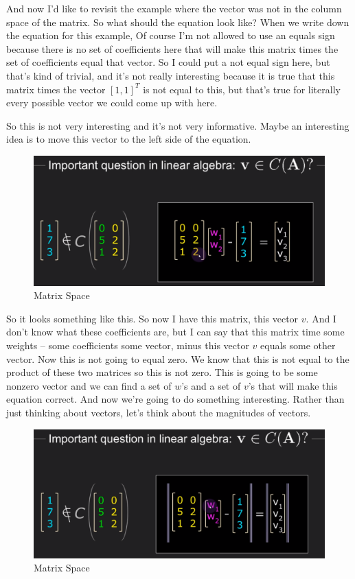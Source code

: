 \documentclass[fleqn,10pt]{olplainarticle}
\theoremstyle{definition}
\theoremstyle{remark}
\begin{document}
And now I'd like to revisit the example where the vector was not in the column space of the matrix. So what should the equation look like? When we write down the equation for this example, Of course I'm not allowed to use an equals sign because there is no set of coefficients here that will make this matrix times the set of coefficients equal that vector. So I could put a not equal sign here, but that's kind of trivial, and it's not really interesting because it is true that this matrix times the vector $[1, 1]^T$ is not equal to this, but that's true for literally every possible vector we could come up with here.

So this is not very interesting and it's not very informative. Maybe an interesting idea is to move this vector to the left side of the equation. 

\begin{figure}[ht]
	\centering
	\includegraphics[width=0.5\linewidth]{images/matrix-space-11.png}
	\caption{Matrix Space}
	\label{fig:matrix_space_11}
\end{figure}

So it looks something like this. So now I have this matrix, this vector $v$. And I don't know what these coefficients are, but I can say that this matrix time some weights -- some coefficients some vector, minus this vector $v$ equals some other vector. Now this is not going to equal zero. We know that this is not equal to the product of these two matrices so this is not zero. This is going to be some nonzero vector and we can find a set of $w$'s and a set of $v$'s that will make this equation correct. And now we're going to do something interesting. Rather than just thinking about vectors, let's think about the magnitudes of vectors.

\begin{figure}[ht]
	\centering
	\includegraphics[width=0.5\linewidth]{images/matrix-space-12.png}
	\caption{Matrix Space}
	\label{fig:matrix_space_12}
\end{figure}
\end{document}
